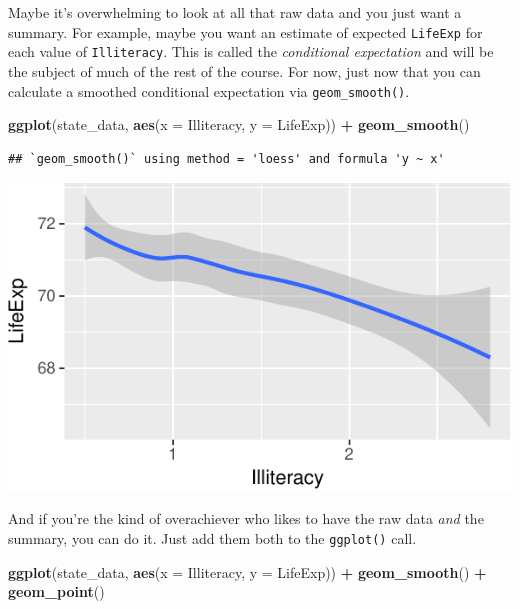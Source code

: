 \documentclass[
  12pt,
  oneside,openany]{book}
\newenvironment{Shaded}{\begin{snugshade}}{\end{snugshade}}
\newcommand{\DataTypeTok}[1]{\textcolor[rgb]{0.13,0.29,0.53}{#1}}
\newcommand{\KeywordTok}[1]{\textcolor[rgb]{0.13,0.29,0.53}{\textbf{#1}}}
\newcommand{\NormalTok}[1]{#1}
\newcommand{\OperatorTok}[1]{\textcolor[rgb]{0.81,0.36,0.00}{\textbf{#1}}}
\newcommand{\StringTok}[1]{\textcolor[rgb]{0.31,0.60,0.02}{#1}}
\begin{document}
Maybe it's overwhelming to look at all that raw data and you just want a summary. For example, maybe you want an estimate of expected \texttt{LifeExp} for each value of \texttt{Illiteracy}. This is called the \emph{conditional expectation} and will be the subject of much of the rest of the course. For now, just now that you can calculate a smoothed conditional expectation via \texttt{geom\_smooth()}.

\begin{Shaded}
\begin{Highlighting}[]
\KeywordTok{ggplot}\NormalTok{(state\_data, }\KeywordTok{aes}\NormalTok{(}\DataTypeTok{x =}\NormalTok{ Illiteracy, }\DataTypeTok{y =}\NormalTok{ LifeExp)) }\OperatorTok{+}
\StringTok{  }\KeywordTok{geom\_smooth}\NormalTok{()}
\end{Highlighting}
\end{Shaded}

\begin{verbatim}
## `geom_smooth()` using method = 'loess' and formula 'y ~ x'
\end{verbatim}

\includegraphics{pdaps_files/figure-latex/smooth-1.pdf}

And if you're the kind of overachiever who likes to have the raw data \emph{and} the summary, you can do it. Just add them both to the \texttt{ggplot()} call.

\begin{Shaded}
\begin{Highlighting}[]
\KeywordTok{ggplot}\NormalTok{(state\_data, }\KeywordTok{aes}\NormalTok{(}\DataTypeTok{x =}\NormalTok{ Illiteracy, }\DataTypeTok{y =}\NormalTok{ LifeExp)) }\OperatorTok{+}
\StringTok{  }\KeywordTok{geom\_smooth}\NormalTok{() }\OperatorTok{+}
\StringTok{  }\KeywordTok{geom\_point}\NormalTok{()}
\end{Highlighting}
\end{Shaded}
\end{document}
